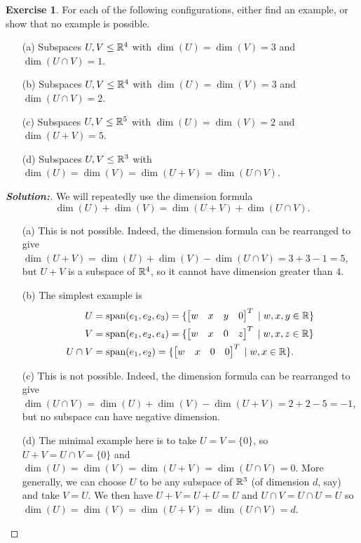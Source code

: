 \documentclass[a4paper]{amsart}
\theoremstyle{definition}
\newtheorem{exercise}{Exercise}
\newenvironment{solution}{\begin{proof}[\textbf{Solution:}] \vphantom{u}}{\end{proof}}
\begin{document}
\begin{exercise}\label{ex-dim-formula-i}
 For each of the following configurations, either find an example, or
 show that no example is possible.
 \begin{itemize}
  \item[(a)] Subspaces $U,V\leq{\mathbb{R}}^4$ with $\dim(U)=\dim(V)=3$ and
   $\dim(U\cap V)=1$.
  \item[(b)] Subspaces $U,V\leq{\mathbb{R}}^4$ with $\dim(U)=\dim(V)=3$ and
   $\dim(U\cap V)=2$.
  \item[(c)] Subspaces $U,V\leq{\mathbb{R}}^5$ with $\dim(U)=\dim(V)=2$ and
   $\dim(U+V)=5$.
  \item[(d)] Subspaces $U,V\leq{\mathbb{R}}^3$ with
   $\dim(U)=\dim(V)=\dim(U+V)=\dim(U\cap V)$.
 \end{itemize}
\end{exercise}
\begin{solution}
 We will repeatedly use the dimension formula 
 \[ \dim(U)+\dim(V) = \dim(U+V) + \dim(U\cap V). \]
 \begin{itemize}
  \item[(a)] This is not possible.  Indeed, the dimension formula can
   be rearranged to give
   $\dim(U+V)=\dim(U)+\dim(V)-\dim(U\cap V)=3+3-1=5$, but $U+V$ is a
   subspace of ${\mathbb{R}}^4$, so it cannot have dimension greater than $4$.
  \item[(b)] The simplest example is  
    \begin{align*}
     U &= \operatorname{span}(e_1,e_2,e_3)
        = \{\left[\begin{matrix} w & x & y & 0 \end{matrix}\right]^T\;|\; w,x,y\in{\mathbb{R}}\} \\
     V &= \operatorname{span}(e_1,e_2,e_4)
        = \{\left[\begin{matrix} w & x & 0 & z \end{matrix}\right]^T\;|\; w,x,z\in{\mathbb{R}}\} \\
     U\cap V &= \operatorname{span}(e_1,e_2)
        = \{\left[\begin{matrix} w & x & 0 & 0 \end{matrix}\right]^T\;|\; w,x\in{\mathbb{R}}\}.
    \end{align*}
   \item[(c)] This is not possible.  Indeed, the dimension formula can
    be rearranged to give
    $\dim(U\cap V)=\dim(U)+\dim(V)-\dim(U+V)=2+2-5=-1$, but no subspace
    can have negative dimension.
   \item[(d)] The minimal example here is to take $U=V=\{0\}$, so
    $U+V=U\cap V=\{0\}$ and $\dim(U)=\dim(V)=\dim(U+V)=\dim(U\cap V)=0$.
    More generally, we can choose $U$ to be any subspace of ${\mathbb{R}}^3$ (of
    dimension $d$, say) and take $V=U$.  We then have $U+V=U+U=U$ and
    $U\cap V=U\cap U=U$ so $\dim(U)=\dim(V)=\dim(U+V)=\dim(U\cap V)=d$.
 \end{itemize}
\end{solution}
\end{document}
